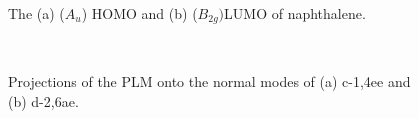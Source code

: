 \begin{figure}[th]
\caption{The (a)  ($A_{u}$) HOMO and (b)  ($B_{2g}) $LUMO of naphthalene.\label{naphHOMOLUMO}}
\end{figure}

\begin{figure}[]
\\
\caption{Projections of the PLM onto the normal modes of (a) c-1,4ee and (b) d-2,6ae.\label{LancProj}}
\end{figure}



